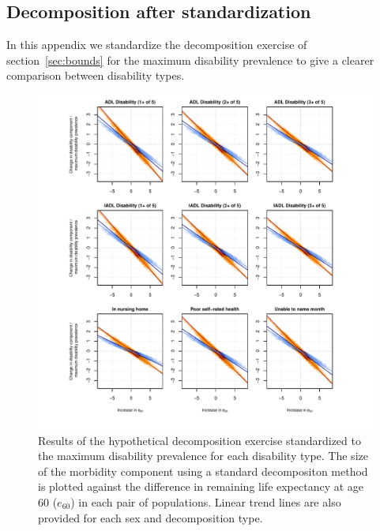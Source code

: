 \documentclass[11pt,oneside,a4paper]{article} %
\begin{document}
\begin{appendices}

\section{Decomposition after standardization}
In this appendix we standardize the decomposition exercise of section~\ref{sec:bounds} for the maximum
disability prevalence to give a clearer comparison between disability types.
\begin{figure}
\begin{adjustwidth}{-1.5cm}{}
	\centering
	\includegraphics[scale=.8]{Figures/Decomp_3x3_rel.pdf}
	\caption{Results of the hypothetical decomposition exercise standardized to the maximum disability prevalence for each disability type. The size of the
	morbidity component using a standard decompositon method is plotted against
	the difference in remaining life expectancy at age 60 ($e_{60}$) in each
	pair of populations. Linear trend lines are also provided for each sex and decomposition type.}
	\label{fig:Fig_Decomp_3x3_rel}
\end{adjustwidth}
\end{figure}



\end{appendices}
\end{document}
